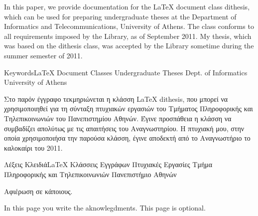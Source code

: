 \documentclass[english]{dithesis} %
\begin{document}
\makethesistitle

\begin{thesisabstract}
  In this paper, we provide documentation for the \LaTeX{} document class
  dithesis, which can be used for preparing undergraduate theses at the
  Department of Informatics and Telecommunications, University of Athens.
  The class conforms to all requirements imposed by the Library, as of September
  2011.
  My thesis, which was based on the dithesis class, was accepted by the Library
  sometime during the summer semester of 2011.

                 {Keywords}{\LaTeX{}}
                           {Document Classes}
                           {Undergraduate Theses}
                           {Dept. of Informatics}
                           {University of Athens}
\end{thesisabstract}

\begin{thesisabstract}[Περίληψη]
  Στο παρόν έγγραφο τεκμηριώνεται η κλάσση \LaTeX{} dithesis, που μπορεί να
  χρησιμοποιηθεί για τη σύνταξη πτυχιακών εργασιών του Τμήματος Πληροφορικής
  και Τηλεπικοινωνιών του Πανεπιστημίου Αθηνών.
  Έγινε προσπάθεια η κλάσση να συμβαδίζει απολύτως με τις απαιτήσεις του
  Αναγνωστηρίου.
  H πτυχιακή μου, στην οποία χρησιμοποιήσα την παρούσα κλάσση, έγινε αποδεκτή
  από το Αναγνωστήριο το καλοκαίρι του 2011.

                 {Λέξεις Κλειδιά}{\LaTeX{}}
                                 {Κλάσσεις Εγγράφων}
                                 {Πτυχιακές Εργασίες}
                                 {Τμήμα Πληροφορικής και Τηλεπικοινωνιών}
                                 {Πανεπιστήμιο Αθηνών}
\end{thesisabstract}

\begin{thesisdedication}
Αφιέρωση σε κάποιους.
\end{thesisdedication}

\begin{thesisacknowledgments}
  In this page you write the aknowlegdments. This page is optional.
\end{thesisacknowledgments}

\tableofcontents
\listoffigures
\listoftables
\end{document}
